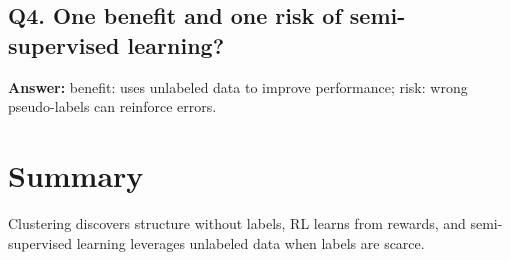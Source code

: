 \documentclass[11pt]{article}
\begin{document}
\subsection*{Q4. One benefit and one risk of semi-supervised learning?}
\textbf{Answer:} benefit: uses unlabeled data to improve performance; risk: wrong pseudo-labels can reinforce errors.

\section{Summary}
Clustering discovers structure without labels, RL learns from rewards, and semi-supervised learning leverages unlabeled data when labels are scarce.
\notesources{\AIMLUnitIVSources}
\end{document}
